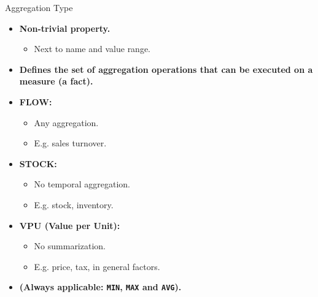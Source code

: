 \begin{frame}{Aggregation Type}
	\begin{itemize}
		\item \textbf{Non-trivial property.}
		      \begin{itemize}
			      \item Next to name and value range.
		      \end{itemize}
		\item \textbf{Defines the set of aggregation operations that can be executed on a measure (a fact).}
		\item \textbf{\color{airforceblue}FLOW:}
		      \begin{itemize}
			      \item Any aggregation.
			      \item E.g. sales turnover.
		      \end{itemize}
		\item \textbf{\color{airforceblue}STOCK:}
		      \begin{itemize}
			      \item No temporal aggregation.
			      \item E.g. stock, inventory.
		      \end{itemize}
		\item \textbf{\color{airforceblue}VPU (Value per Unit):}
		      \begin{itemize}
			      \item No summarization.
			      \item E.g. price, tax, in general factors.
		      \end{itemize}
		\item \textbf{(Always applicable: \texttt{MIN}, \texttt{MAX} and \texttt{AVG}).}
	\end{itemize}
\end{frame}

